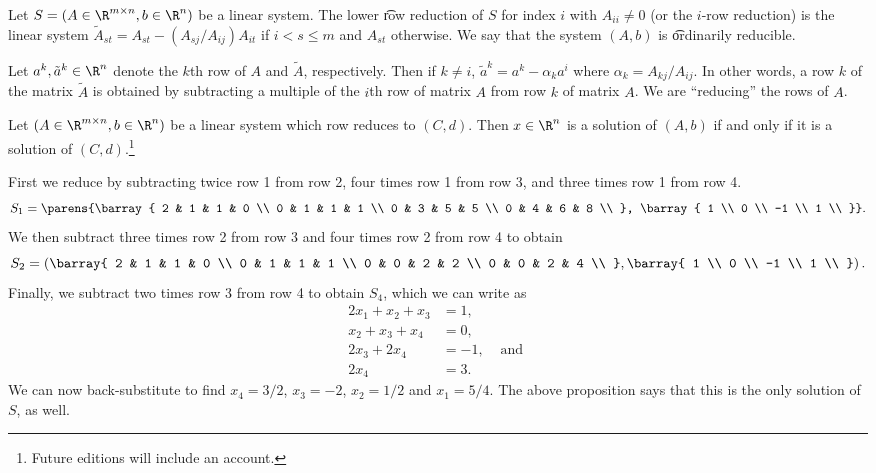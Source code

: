 Let $S = (A \in \R ^{m \times n}, b \in \R ^{n})$ be a linear system.
The lower \t{row reduction} of $S$ for index $i$ with $A_{ii} \neq 0$ (or the $i$-row reduction) is the linear system $\tilde{A}_{st} = A_{st} - (A_{sj}/A_{ij})A_{it}$ if $i < s \leq m$ and $A_{st}$ otherwise.
We say that the system $(A, b)$ is \t{ordinarily reducible}.

Let $a^k, \tilde{a}^k \in \R ^{n}$ denote the $k$th row of $A$ and $\tilde{A}$, respectively.
Then if $k \neq i$, $\tilde{a}^k = a^k - \alpha _k a^i$ where $\alpha _k = A_{kj}/A_{ij}$.
In other words, a row $k$ of the matrix $\tilde{A}$ is obtained by subtracting a multiple of the $i$th row of matrix $A$ from row $k$ of matrix $A$.
We are ``reducing'' the rows of $A$.

\begin{proposition}

\label{propostion:linear_system_reductions:solution_equivalence}Let $(A \in \R ^{m \times n}, b \in \R ^{n})$ be a linear system which row reduces to $(C, d)$.
Then $x \in \R ^{n}$ is a solution of $(A, b)$ if and only if it is a solution of $(C, d)$.\footnote{Future editions will include an account.}
\end{proposition}

First we reduce by subtracting twice row 1 from row 2, four times row 1 from row 3, and three times row 1 from row 4.
\[
S_1 = \parens{\barray{
2 & 1 & 1 & 0 \\
0 & 1 & 1 & 1 \\
0 & 3 & 5 & 5 \\
0 & 4 & 6 & 8 \\
}, \barray{
1 \\
0 \\
-1 \\
1 \\
}}.
\]
We then subtract three times row 2 from row 3 and four times row 2 from row 4 to obtain
\[
S_2 = \left(\barray{
2 & 1 & 1 & 0 \\
0 & 1 & 1 & 1 \\
0 & 0 & 2 & 2 \\
0 & 0 & 2 & 4 \\
}, \barray{
1 \\
0 \\
-1 \\
1 \\
}\right).
\]
Finally, we subtract two times row 3 from row 4 to obtain $S_4$, which we can write as
\[
\begin{aligned}
2x_1 + x_2 + x_3 &= 1,& \\
x_2 + x_3 + x_4 &= 0,& \\
2x_3 + 2x_4 &= -1,& \text{ and } \\
2x_4 &= 3.&
\end{aligned}
\]
We can now back-substitute to find $x_4 = 3/2$, $x_3 = -2$, $x_2 = 1/2$ and $x_1 = 5/4$.
The above proposition says that this is the only solution of $S$, as well.
